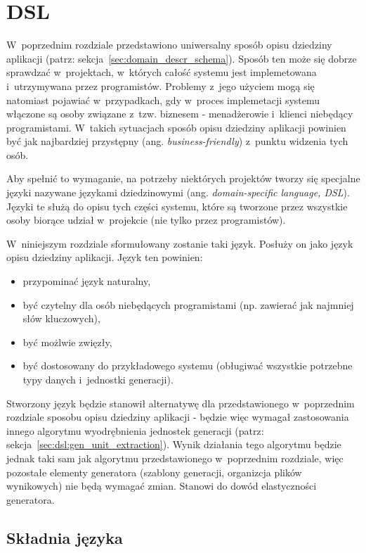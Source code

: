 \chapter{DSL}

W~poprzednim rozdziale przedstawiono uniwersalny sposób opisu dziedziny aplikacji (patrz: sekcja~\ref{sec:domain_descr_schema}).
Sposób ten może się dobrze sprawdzać w~projektach, w~których całość systemu jest implemetowana i~utrzymywana przez programistów.
Problemy z~jego użyciem mogą się natomiast pojawiać w~przypadkach, gdy w~proces implemetacji systemu włączone są osoby związane z~tzw. biznesem - menadżerowie i~klienci niebędący programistami.
W~takich sytuacjach sposób opisu dziedziny aplikacji powinien być jak najbardziej przystępny (ang. \emph{business-friendly}) z~punktu widzenia tych osób.

Aby spełnić to wymaganie, na potrzeby niektórych projektów tworzy się specjalne języki nazywane językami dziedzinowymi (ang. \emph{domain-specific language, DSL}).
Języki te służą do opisu tych części systemu, które są tworzone przez wszystkie osoby biorące udział w~projekcie (nie tylko przez programistów).

W~niniejszym rozdziale sformułowany zostanie taki język.
Posłuży on jako język opisu dziedziny aplikacji.
Język ten powinien:

\begin{itemize}
 \item przypominać język naturalny,
 \item być czytelny dla osób niebędących programistami (np. zawierać jak najmniej słów kluczowych),
 \item być możlwie zwięzły,
 \item być dostosowany do przykładowego systemu (obługiwać wszystkie potrzebne typy danych i~jednostki generacji).
\end{itemize}

Stworzony język będzie stanowił alternatywę dla przedstawionego w~poprzednim rozdziale sposobu opisu dziedziny aplikacji - będzie więc wymagał zastosowania innego algorytmu wyodrębnienia jednostek generacji (patrz: sekcja~\ref{sec:dsl:gen_unit_extraction}).
Wynik działania tego algorytmu będzie jednak taki sam jak algorytmu przedstawionego w~poprzednim rozdziale, więc pozostałe elementy generatora (szablony generacji, organizcja plików wynikowych) nie będą wymagać zmian.
Stanowi do dowód elastyczności generatora.


\section{Składnia języka}

